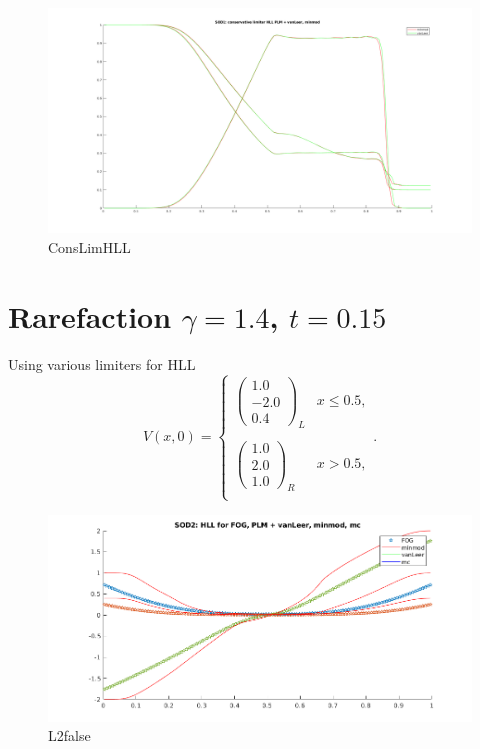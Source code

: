 \begin{figure}[H]
  \centering
  \includegraphics[width=0.8\linewidth]{consLimHLL.png}
  \caption{ConsLimHLL}%
  \label{fig:consLimHLL}
\end{figure}

\section{Rarefaction $\gamma = 1.4$, $t = 0.15$}%

Using various limiters for HLL
\[
V(x,0) =
\begin{cases}
 \begin{pmatrix}
   1.0 \\ -2.0 \\ 0.4
 \end{pmatrix}_L & x \leq 0.5, \\\\
 \begin{pmatrix}
   1.0 \\ 2.0 \\ 1.0 
 \end{pmatrix}_R & x > 0.5, \\
\end{cases}
.\] 

\begin{figure}[H]
  \centering
  \includegraphics[width=0.8\linewidth]{HLL2false.png}
  \caption{L2false}%
  \label{fig:L2false}
\end{figure}
